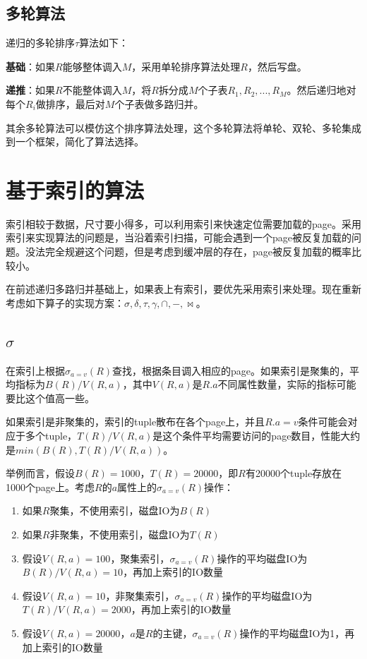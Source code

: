 \subsection{多轮算法}

递归的多轮排序$\tau$算法如下：

\textbf{基础}：如果$R$能够整体调入$M$，采用单轮排序算法处理$R$，然后写盘。

\textbf{递推}：如果$R$不能整体调入$M$，将$R$拆分成$M$个子表$R_1, R_2, ..., R_M$。然后递归地对每个$R_i$做排序，最后对$M$个子表做多路归并。

其余多轮算法可以模仿这个排序算法处理，这个多轮算法将单轮、双轮、多轮集成到一个框架，简化了算法选择。

\section{基于索引的算法}

索引相较于数据，尺寸要小得多，可以利用索引来快速定位需要加载的page。采用索引来实现算法的问题是，当沿着索引扫描，可能会遇到一个page被反复加载的问题。没法完全规避这个问题，但是考虑到缓冲层的存在，page被反复加载的概率比较小。

在前述递归多路归并基础上，如果表上有索引，要优先采用索引来处理。现在重新考虑如下算子的实现方案：$\sigma, \delta, \tau, \gamma, \cap, -, \bowtie$。

\subsection*{$\sigma$}

在索引上根据$\sigma_{a=v}(R)$查找，根据条目调入相应的page。如果索引是聚集的，平均指标为$B(R)/V(R,a)$，其中$V(R,a)$是$R.a$不同属性数量，实际的指标可能要比这个值高一些。

如果索引是非聚集的，索引的tuple散布在各个page上，并且$R.a=v$条件可能会对应于多个tuple，$T(R)/V(R,a)$是这个条件平均需要访问的page数目，性能大约是$min(B(R), T(R)/V(R,a))$。

举例而言，假设$B(R)=1000$，$T(R)=20000$，即$R$有20000个tuple存放在1000个page上。考虑$R$的$a$属性上的$\sigma_{a=v}(R)$操作：
\begin{enumerate}
    \item 如果$R$聚集，不使用索引，磁盘IO为$B(R)$
    \item 如果$R$非聚集，不使用索引，磁盘IO为$T(R)$
    \item 假设$V(R,a)=100$，聚集索引，$\sigma_{a=v}(R)$操作的平均磁盘IO为$B(R)/V(R,a)=10$，再加上索引的IO数量
    \item 假设$V(R,a)=10$，非聚集索引，$\sigma_{a=v}(R)$操作的平均磁盘IO为$T(R)/V(R,a)=2000$，再加上索引的IO数量
    \item 假设$V(R,a)=20000$，$a$是$R$的主键，$\sigma_{a=v}(R)$操作的平均磁盘IO为1，再加上索引的IO数量
\end{enumerate}

